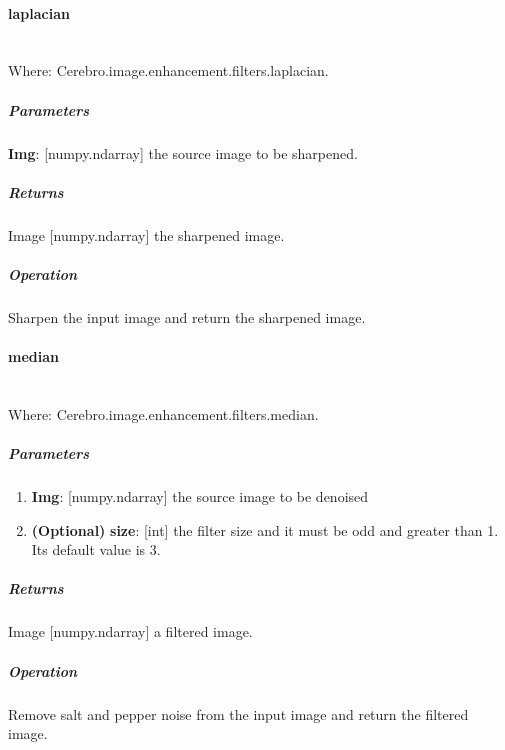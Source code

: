 \paragraph{laplacian} \mbox{} \\
Where: Cerebro.image.enhancement.filters.laplacian.
\subparagraph{Parameters}
\begin{changemargin}{1cm}{0cm}
	\textbf{Img}: [numpy.ndarray] the source image to be sharpened.
\end{changemargin}

\subparagraph{Returns}
\begin{changemargin}{1cm}{0cm}
	Image [numpy.ndarray] the sharpened image.
\end{changemargin}

\subparagraph{Operation}
\begin{changemargin}{1cm}{0cm}
	Sharpen the input image and return the sharpened image.
\end{changemargin}


\paragraph{median} \mbox{} \\
Where: Cerebro.image.enhancement.filters.median.
\subparagraph{Parameters}
\begin{changemargin}{0.5cm}{0cm}
	\begin{enumerate}
		\item \textbf{Img}: [numpy.ndarray] the source image to be denoised
		\item \textbf{(Optional)} \textbf{size}: [int] the filter size and it must be odd and greater than 1. Its default value is 3.
	\end{enumerate}
\end{changemargin}

\subparagraph{Returns}
\begin{changemargin}{1cm}{0cm}
	Image [numpy.ndarray] a filtered image.
\end{changemargin}

\subparagraph{Operation}
\begin{changemargin}{1cm}{0cm}
 	Remove salt and pepper noise from the input image and return the filtered image.
\end{changemargin}

 	
